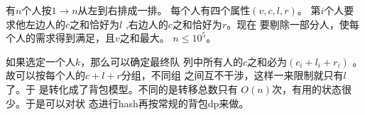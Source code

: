 \begin{prob}
	有$n$个人按$1 \to n$从左到右排成一排。
	每个人有四个属性$(v,c,l,r)$。
	第$i$个人要求他左边人的$c$之和恰好为$l$
	,右边人的$c$之和恰好为$r$。现在
	要剔除一部分人，使每个人的需求得到满足，且$v$之和最大。
	$n \le 10^5$。
\end{prob}

\begin{sol}
	如果选定一个人$k$，那么可以确定最终队
	列中所有人的$c$之和必为$(c_i+l_i+r_i)$
	。故可以按每个人的$c+l+r$分组，不同组
	之间互不干涉，这样一来限制就只有$l$了。于
	是转化成了背包模型。不同的是转移总数只有
	$O(n)$次，有用的状态很少。于是可以对状
	态进行hash再按常规的背包dp来做。
\end{sol}
